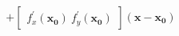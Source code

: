\documentclass[preview]{standalone}
\begin{document}
\begin{align*}
+ \begin{bmatrix} f_x^{\prime}(\mathbf{x_0})\ f_y^{\prime}(\mathbf{x_0}) \end{bmatrix} (\mathbf{x} - \mathbf{x_0})
\end{align*}
\end{document}

